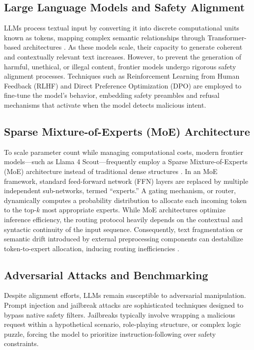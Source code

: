 \documentclass[conference]{IEEEtran}
\begin{document}
    \subsection{Large Language Models and Safety Alignment}
    LLMs process textual input by converting it into discrete computational units known as tokens, mapping complex semantic relationships through Transformer-based architectures \cite{vaswani2017attention}. As these models scale, their capacity to generate coherent and contextually relevant text increases. However, to prevent the generation of harmful, unethical, or illegal content, frontier models undergo rigorous safety alignment processes. Techniques such as Reinforcement Learning from Human Feedback (RLHF) \cite{ouyang2022training} and Direct Preference Optimization (DPO) \cite{rafailov2023direct} are employed to fine-tune the model's behavior, embedding safety preambles and refusal mechanisms that activate when the model detects malicious intent.

\subsection{Sparse Mixture-of-Experts (MoE) Architecture}
To scale parameter count while managing computational costs, modern frontier models—such as Llama 4 Scout—frequently employ a Sparse Mixture-of-Experts (MoE) architecture instead of traditional dense structures \cite{shazeer2017outrageously}. In an MoE framework, standard feed-forward network (FFN) layers are replaced by multiple independent sub-networks, termed ``experts.'' A gating mechanism, or router, dynamically computes a probability distribution to allocate each incoming token to the top-$k$ most appropriate experts. While MoE architectures optimize inference efficiency, the routing protocol heavily depends on the contextual and syntactic continuity of the input sequence. Consequently, text fragmentation or semantic drift introduced by external preprocessing components can destabilize token-to-expert allocation, inducing routing inefficiencies \cite{fedus2022switch, liu2025compressionattack}.

\subsection{Adversarial Attacks and Benchmarking}
Despite alignment efforts, LLMs remain susceptible to adversarial manipulation. Prompt injection \cite{greshake2023not} and jailbreak attacks \cite{wei2023jailbroken} are sophisticated techniques designed to bypass native safety filters. Jailbreaks typically involve wrapping a malicious request within a hypothetical scenario, role-playing structure, or complex logic puzzle, forcing the model to prioritize instruction-following over safety constraints. 
\end{document}
